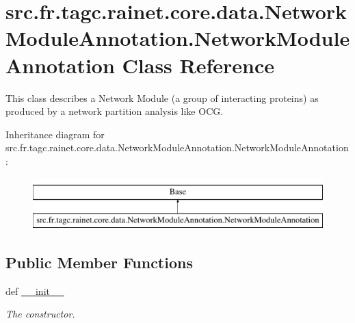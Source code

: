 \hypertarget{classsrc_1_1fr_1_1tagc_1_1rainet_1_1core_1_1data_1_1NetworkModuleAnnotation_1_1NetworkModuleAnnotation}{\section{src.\-fr.\-tagc.\-rainet.\-core.\-data.\-Network\-Module\-Annotation.\-Network\-Module\-Annotation Class Reference}
\label{classsrc_1_1fr_1_1tagc_1_1rainet_1_1core_1_1data_1_1NetworkModuleAnnotation_1_1NetworkModuleAnnotation}
}


This class describes a Network Module (a group of interacting proteins) as produced by a network partition analysis like O\-C\-G.  


Inheritance diagram for src.\-fr.\-tagc.\-rainet.\-core.\-data.\-Network\-Module\-Annotation.\-Network\-Module\-Annotation\-:\begin{figure}[H]
\begin{center}
\leavevmode
\includegraphics[height=2.000000cm]{classsrc_1_1fr_1_1tagc_1_1rainet_1_1core_1_1data_1_1NetworkModuleAnnotation_1_1NetworkModuleAnnotation}
\end{center}
\end{figure}
\subsection*{Public Member Functions}
\begin{DoxyCompactItemize}
\item 
\hypertarget{classsrc_1_1fr_1_1tagc_1_1rainet_1_1core_1_1data_1_1NetworkModuleAnnotation_1_1NetworkModuleAnnotation_aee2e9099e4e32b5aaac46841ab38a620}{def \hyperlink{classsrc_1_1fr_1_1tagc_1_1rainet_1_1core_1_1data_1_1NetworkModuleAnnotation_1_1NetworkModuleAnnotation_aee2e9099e4e32b5aaac46841ab38a620}{\-\_\-\-\_\-init\-\_\-\-\_\-}}\label{classsrc_1_1fr_1_1tagc_1_1rainet_1_1core_1_1data_1_1NetworkModuleAnnotation_1_1NetworkModuleAnnotation_aee2e9099e4e32b5aaac46841ab38a620}

\begin{DoxyCompactList}\small\item\em The constructor. \end{DoxyCompactList}\end{DoxyCompactItemize}
